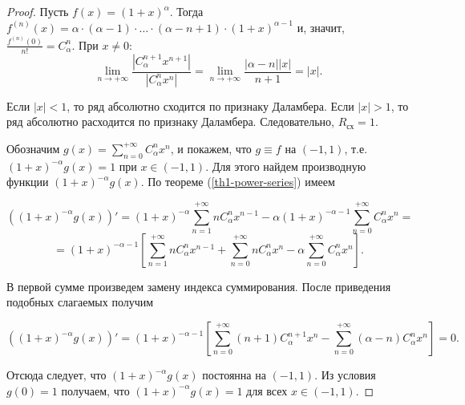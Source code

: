 \begin{proof}
    Пусть $f(x) = (1 + x)^{\alpha}$. Тогда $f^{(n)}(x) = \alpha \cdot (\alpha - 1) \cdot \ldots \cdot (\alpha - n + 1) \cdot (1 + x)^{\alpha - 1}$ и, значит, $\frac{f^{(n)}(0)}{n!} = C_{\alpha}^{n}$. При $x \not= 0$:
    \[\lim_{n \to +\infty}\frac{|C_{\alpha}^{n + 1} x^{n + 1}|}{|C_{\alpha}^{n}x^{n}|} = \lim_{n \to +\infty} \frac{|\alpha - n||x|}{n + 1} = |x|.\]
    
    Если $|x| < 1$, то ряд абсолютно сходится по признаку Даламбера.
    Если $|x| > 1$, то ряд абсолютно расходится по признаку Даламбера.
    Следовательно, $R_{\text{сх}} = 1$.

    Обозначим $g(x) = \sum_{n = 0}^{+\infty} C_{\alpha}^{n}x^{n}$, и покажем, что $g \equiv f$ на $(-1, 1)$, т.е. $(1 + x)^{-\alpha} g(x) = 1$ при $x \in (-1, 1)$. Для этого найдем производную функции $(1 + x)^{-\alpha} g(x)$. По теореме (\ref{th1-power-series}) имеем
    
    \[((1 + x)^{-\alpha} g(x))' = (1 + x)^{-\alpha} \sum_{n = 1}^{+\infty}n C_{\alpha}^{n}x^{n - 1} - \alpha(1 + x)^{-\alpha - 1} \sum_{n = 0}^{+\infty} C_{\alpha}^{n}x^{n} = \]
    \[ = (1 + x)^{-\alpha - 1}\left[\sum_{n = 1}^{+\infty}n C_{\alpha}^{n} x^{n - 1} + \sum_{n = 0}^{+\infty}n C_{\alpha}^{n}x^{n} - \alpha \sum_{n = 0}^{+\infty}C_{\alpha}^{n} x^{n}\right].\]

    В первой сумме произведем замену индекса суммирования. После приведения подобных слагаемых получим

    \[((1 + x)^{-\alpha} g(x))' = (1 + x)^{-\alpha - 1}\left[\sum_{n = 0}^{+\infty}(n + 1) C_{\alpha}^{n + 1} x^{n} - \sum_{n = 0}^{+\infty}(\alpha - n) C_{\alpha}^{n}x^{n}\right] = 0.\]

    Отсюда следует, что $(1 + x)^{-\alpha} g(x)$ постоянна на $(-1, 1)$. Из условия $g(0) = 1$ получаем, что $(1 + x)^{-\alpha}g(x) = 1$ для всех $x \in (-1, 1)$.
\end{proof}